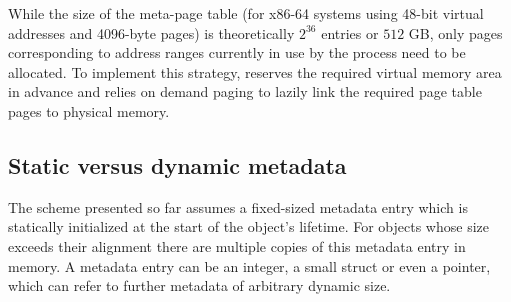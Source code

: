 While the size of the meta-page table (for x86-64 systems using 48-bit virtual addresses and 4096-byte pages)
is theoretically $2^{36}$ entries or $512$ GB, only pages corresponding to address ranges currently in use by the process need to be allocated. To implement this strategy, \projectname{} reserves the required virtual memory area in advance and relies on demand paging to lazily link the required page table pages to physical memory.

\subsection{Static versus dynamic metadata}
\label{sec:metadata}

The scheme presented so far assumes a fixed-sized metadata entry
which is statically initialized at the start of the object's lifetime.
For objects whose size exceeds their alignment there are multiple copies
of this metadata entry in memory.
A metadata entry can be an integer, a small struct
or even a pointer, which can refer to further metadata of arbitrary dynamic size.

